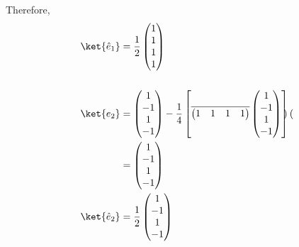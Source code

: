 \documentclass[10pt]{mypackage}
\begin{document}
Therefore,
\begin{align*}
  \ket{\hat{e}_1} &= \frac{1}{2} \begin{pmatrix}1\\1\\1\\1\end{pmatrix}\\
  \\
  \ket{e_2} &= \begin{pmatrix}1\\-1\\1\\-1\end{pmatrix} - \frac{1}{4} \left[\overline{ \begin{pmatrix}1 & 1 & 1 & 1\end{pmatrix} } \begin{pmatrix}1\\-1\\1\\-1\end{pmatrix}\right] \begin{pmatrix}\end{pmatrix}\\
            &= \begin{pmatrix}1 \\ -1 \\ 1 \\ -1\end{pmatrix}\\
  \ket{\hat{e}_2} &= \frac{1}{2} \begin{pmatrix}1\\-1\\1\\-1\end{pmatrix}\\
  \\

\end{align*}
\end{document}
